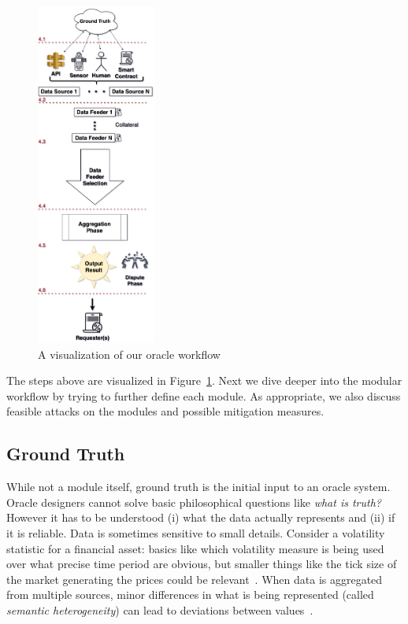 \begin{figure}[t!]
    \centering
    \includegraphics[width=0.35\textwidth]{figures/data_flow_vertical.png}
    \caption{A visualization of our oracle workflow}
    \label{fig:dataflow}
\end{figure}	
	
	
	
The steps above are visualized in Figure~\ref{fig:dataflow}. Next we dive deeper into the modular workflow by trying to further define each module. As appropriate, we also discuss feasible attacks on the modules and possible mitigation measures.


\subsection{Ground Truth}\label{ground_truth} 

While not a module itself, ground truth is the initial input to an oracle system. Oracle designers cannot solve basic philosophical questions like \textit{what is truth?} However it has to be understood (i) what the data actually represents and (ii) if it is reliable. Data is sometimes sensitive to small details. Consider a volatility statistic for a financial asset: basics like which volatility measure is being used over what precise time period are obvious, but smaller things like the tick size of the market generating the prices could be relevant~\cite{firat2002knowledge}. When data is aggregated from multiple sources, minor differences in what is being represented (called \emph{semantic heterogeneity}) can lead to deviations between values~\cite{madnick2006improving,worboys1991semantic,hakimpour2001resolving}.

